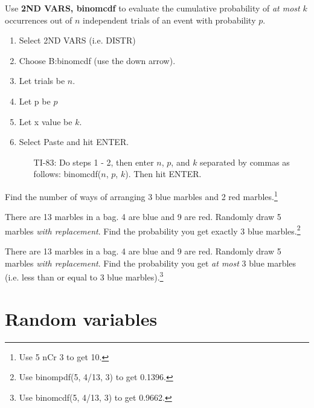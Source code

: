 \begin{termBox}{ 
Use \textbf{2ND VARS, binomcdf} to evaluate the cumulative probability of \emph{at most} $k$ occurrences out of $n$ independent trials of an event with probability $p$. 
\begin{enumerate}
\setlength{\itemsep}{0mm}
\item Select 2ND VARS (i.e. DISTR)
\item Choose B:binomcdf  (use the down arrow).
\item Let trials be $n$.
\item Let p be $p$
\item Let x value be $k$.
\item Select Paste and hit ENTER.\vspace{-1.5mm}
\begin{itemize}
\item[TI-83: ] Do steps 1 - 2, then enter $n$, $p$, and $k$ separated by commas as follows: binomcdf($n$, $p$, $k$). Then hit ENTER.
\end{itemize}
\end{enumerate}
}
\end{termBox}

\begin{exercise}Find the number of ways of arranging 3 blue marbles and 2 red marbles.\footnote{Use 5 nCr 3 to get 10. }
\end{exercise}

\begin{exercise}There are 13 marbles in a bag.  4 are blue and 9 are red.  Randomly draw 5 marbles \emph{with replacement}.  Find the probability you get exactly 3 blue marbles.\footnote{Use binompdf(5, 4/13, 3) to get 0.1396.}
\end{exercise}

\begin{exercise}There are 13 marbles in a bag.  4 are blue and 9 are red.  Randomly draw 5 marbles \emph{with replacement}.  Find the probability you get \emph{at most} 3 blue marbles (i.e. less than or equal to 3 blue marbles).\footnote{Use binomcdf(5, 4/13, 3) to get 0.9662.}
\end{exercise}




\section{Random variables}
\label{randomVariablesSection}

